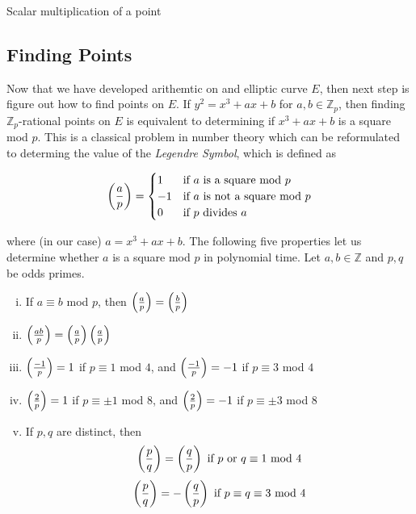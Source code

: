 \begin{algorithm} 
	\caption{Scalar multiplication of a point}
	\begin{algorithmic}[1]
		  		\State {}
		  		\State {}
		  		\State {}
		  	\Else 
		  		\State {}
		  	\EndIf
	  	\EndFunction
	\end{algorithmic} 
\end{algorithm} 

\subsection{Finding Points}

Now that we have developed arithemtic on and elliptic curve $E$, then next step is figure out how to find points on $E$. If $y^2 = x^3 + ax + b$ for $a,b \in \mathbb{Z}_p$, then finding $\mathbb{Z}_p$-rational points on $E$ is equivalent to determining if $x^3 + ax + b$ is a square mod $p$. This is a classical problem in number theory which can be reformulated to determing the value of the \textit{Legendre Symbol}, which is defined as 

$$ \left(\frac{a}{p}\right) =
\begin{cases}
1 &\text{if }a \text{ is a square mod } p\\
-1 &\text{if }a \text{ is not a square mod }p\\
0 & \text{if } p \text{ divides }a
\end{cases} 
$$ 

where (in our case) $a = x^3 + ax + b$. The following five properties let us determine whether $a$ is a square mod $p$ in polynomial time. Let $a,b \in \mathbb{Z}$ and $p,q$ be odds primes.

\begin{enumerate}[(i)]
	\item \label{modequiv} If $a \equiv b$ mod $p$, then $\left(\frac{a}{p}\right) = \left(\frac{b}{p}\right)$
	\item \label{multiplicative} $\left(\frac{ab}{p}\right) = \left(\frac{a}{p}\right) \left(\frac{a}{p}\right) $
	\item \label{1iseasy} $\left(\frac{-1}{p}\right) = 1$ if $p \equiv 1 $ mod $4$, and $\left(\frac{-1}{p}\right) = -1$ if $p \equiv 3 $ mod $4$
	\item \label{2iseasy} $\left(\frac{2}{p}\right) = 1$ if $p \equiv \pm 1 $ mod $8$, and $\left(\frac{2}{p}\right) = -1$ if $p \equiv \pm 3 $ mod $8$
	\item \label{reciprocity} If $p,q$ are distinct, then 
		$$ 
			\left(\frac{p}{q}\right) = \left(\frac{q}{p}\right) \text { if } p \text { or } q \equiv 1 \text{ mod } 4
		$$ 
		$$  
			\left(\frac{p}{q}\right) = - \left(\frac{q}{p}\right) \text { if } p \equiv q \equiv 3 \text{ mod } 4
		$$
\end{enumerate}

